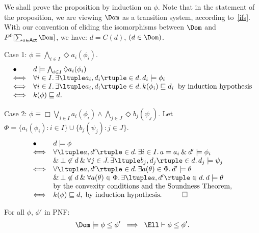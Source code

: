 We shall prove the proposition by induction on $\phi$.
Note that in the statement of the proposition, we are viewing $\Dom$ as a transition system, according to~\ref{ifs}.
With our convention of eliding the isomorphisms between $\Dom$ and $P^{0} [ \sum_{a \in {\sf Act}} \Dom ]$, we have:
$d = C(d)$, $(d \in \Dom )$. 

\noindent Case 1:  $\phi \equiv \bigwedge_{i \in I} \Diamond a_{i}(\phi_{i} )$.
\[ \begin{array}{ll}
\bullet & d \models \bigwedge_{i \in I} \Diamond a_{i}(\phi_{i}) \\
\Longleftrightarrow & \forall i \in I . \, \exists \ltuple a_{i}, d_{i} \rtuple \in d . \, d_{i} \models \phi_{i} \\
\Longleftrightarrow & \forall i \in I . \, \exists \ltuple a_{i}, d_{i} \rtuple \in d . \, k(\phi_{i}) \sqsubseteq d_{i} \;\; \mbox{by induction hypothesis} \\
\Longleftrightarrow & k(\phi ) \sqsubseteq d .
\end{array} \]

\noindent Case 2: $\phi  \equiv  \Box \bigvee_{i \in I} a_{i}(\phi_{i})  \wedge  \bigwedge_{j \in J} \Diamond b_{j}(\psi_{j})$.
Let $\Phi = \{ a_{i}(\phi_{i}) : i \in I \} \cup \{ b_{j}(\psi_{j}) : j \in J \}$.
\[ \begin{array}{ll}
\bullet & d \models \phi \\
\Longleftrightarrow & \forall \ltuple a, d' \rtuple \in d. \, \exists i \in I . \, a = a_{i} \: \& \: d' \models \phi_{i} \\
& \& \: \bot \not\in d \: \& \: \forall j \in J . \, \exists \ltuple b_{j}, d_{j} \rtuple \in d . \, d_{j} \models \psi_{j} \\
\Longleftrightarrow & \forall \ltuple a, d' \rtuple \in d. \, \exists  a(\theta ) \in \Phi . \, d' \models \theta \\
& \& \: \bot \not\in d \: \& \: \forall a(\theta ) \in \Phi . \, \exists \ltuple a, d' \rtuple \in d . \, d \models \theta \\
& \mbox{by the convexity conditions and the Soundness Theorem,} \\
\Longleftrightarrow & k(\phi ) \sqsubseteq d, \; \mbox{by induction hypothesis.} \;\;\; \qed
\end{array} \]

\begin{theorem}
For all $\phi$, $\phi'$ in PNF:
\[ \Dom  \models  \phi \leq \phi' \;\; \Longrightarrow \;\; \Ell  \vdash  \phi \leq \phi' . \]
\end{theorem}

